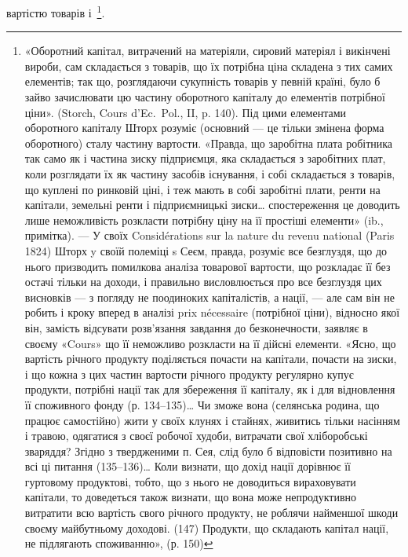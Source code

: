 вартістю товарів і~\footnote{
«Оборотний капітал, витрачений на матеріяли, сировий матеріял і викінчені вироби, сам
складається з товарів, що їх потрібна ціна складена з тих самих елементів; так що, розглядаючи
сукупність товарів у певній країні, було б зайво зачислювати цю частину оборотного капіталу до
елементів потрібної ціни». (Storch, Cours d’Ec.~Pol., II, p. 140). Під цими елементами оборотного
капіталу Шторх розуміє (основний — це тільки змінена форма оборотного) сталу частину вартости.
«Правда, що заробітна плата робітника так само як і частина зиску підприємця, яка складається з
заробітних плат, коли розглядати їх як частину засобів існування, і собі складається з товарів, що
куплені по ринковій ціні, і теж мають в собі заробітні плати, ренти на капітали, земельні ренти і
підприємницькі зиски\dots{} спостереження це доводить лише неможливість розкласти потрібну ціну на її
простіші елементи» (ib., примітка). — У своїх Considérations sur la nature du revenu national (Paris
1824)
Шторх y своїй полеміці s Сеєм, правда, розуміє все безглуздя, що до нього призводить помилкова
аналіза товарової вартости, що розкладає її без остачі тільки на доходи, і правильно висловлюється
про все безглуздя цих висновків — з погляду не поодиноких капіталістів, а нації, — але сам він не
робить і кроку вперед в аналізі prix nécessaire (потрібної ціни), відносно якої він, замість
відсувати розв’язання
завдання до безконечности, заявляє в своєму «Cours» що її неможливо розкласти на її дійсні елементи.
«Ясно, що вартість річного продукту поділяється почасти на капітали, почасти на зиски, і що кожна з
цих частин вартости річного продукту регулярно купує продукти, потрібні нації так для збереження її
капіталу, як і для відновлення її споживного фонду (р. 134--135)\dots{} Чи зможе вона (селянська родина,
що працює самостійно) жити у своїх клунях і стайнях, живитись тільки насінням
і травою, одягатися з своєї робочої худоби, витрачати свої хліборобські зваряддя? Згідно з
твердженими п. Сея, слід було б відповісти позитивно на всі ці питання (135--136)\dots{} Коли визнати, що
дохід нації дорівнює її гуртовому продуктові, тобто, що з нього не доводиться вираховувати капітали,
то доведеться також визнати, що вона може непродуктивно витратити всю вартість свого річного
продукту,
не роблячи найменшої шкоди своєму майбутньому доходові. (147) Продукти, що складають капітал нації,
не підлягають споживанню», (р. 150)
}.

